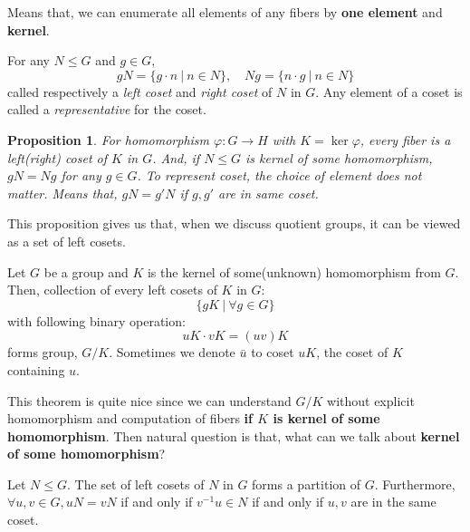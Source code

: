 \documentclass[12pt, a4paper, openany, twoside]{book}
\newtheorem{prop}[thm]{Proposition}
\theoremstyle{definition}
\theoremstyle{remark}
\theoremstyle{plain}
\numberwithin{equation}{section}
\begin{document}
Means that, we can enumerate all elements of any fibers by \textbf{one element} and \textbf{kernel}. 

\begin{tcolorbox}[colback=yellow!10!white,colframe=brown!75!black,title=Cosets]

For any $N \leq G$ and $g \in G$, 
\[gN = \{g\cdot n ~|~ n \in N\}, \quad Ng = \{n \cdot g ~|~ n \in N\}\]
called respectively a \textit{left coset} and \textit{right coset} of $N$ in $G$. 
Any element of a coset is called a \textit{representative} for the coset. 
\end{tcolorbox}

\begin{prop}
    
For homomorphism $\varphi: G \rightarrow H$ with $K = \ker \varphi$, 
every fiber is a left(right) coset of $K$ in $G$. And, if $N \leq G$ is kernel of some homomorphism, $gN = Ng$ for any $g \in G$. 
To represent coset, the choice of element does not matter. Means that, $gN = g'N$ if $g, g'$ are in same coset. 

\end{prop}

This proposition gives us that, when we discuss quotient groups, it can be viewed as a set of left cosets. 

\begin{tcolorbox}[colback=yellow!10!white,colframe=blue!75!black,title=Theorem 3]

Let $G$ be a group and $K$ is the kernel of some(unknown) homomorphism from $G$. Then, 
collection of every left cosets of $K$ in $G$: 
\[\{gK ~|~ \forall g \in G\}\]
with following binary operation: 
\[uK \cdot vK = (uv)K\]
forms group, $G / K$. Sometimes we denote $\bar{u}$ to coset $uK$, the coset of $K$ containing $u$.

\end{tcolorbox}

This theorem is quite nice since we can understand $G/K$ without explicit homomorphism and computation of fibers \textbf{if $K$ is kernel of some homomorphism}. 
Then natural question is that, what can we talk about \textbf{kernel of some homomorphism}? 

\begin{tcolorbox}[colback=yellow!10!white,colframe=green!75!black,title=Proposition 4]

Let $N \leq G$. The set of left cosets of $N$ in $G$ forms a partition of $G$. Furthermore, $\forall u, v \in G, uN = vN$ if and only if $v^{-1}u \in N$ if and only if $u, v$ are in the same coset.

\end{tcolorbox}
\end{document}
